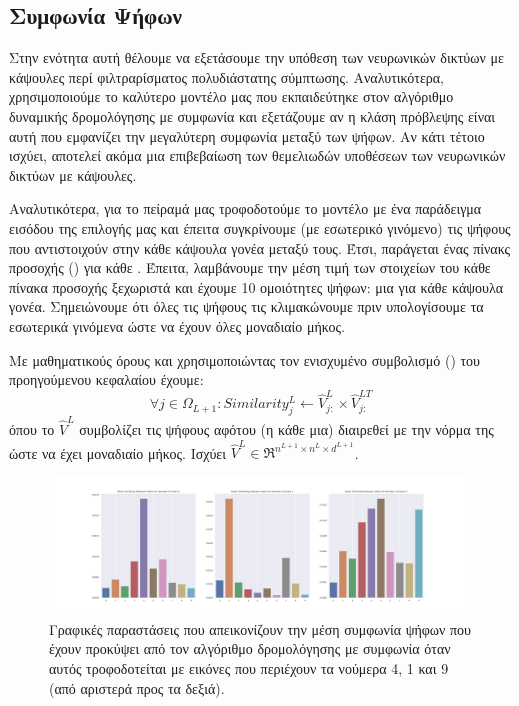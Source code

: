 \subsection{Συμφωνία Ψήφων}
Στην ενότητα αυτή θέλουμε να εξετάσουμε την υπόθεση των νευρωνικών δικτύων με κάψουλες περί φιλτραρίσματος πολυδιάστατης σύμπτωσης. Αναλυτικότερα, χρησιμοποιούμε το καλύτερο μοντέλο μας που εκπαιδεύτηκε στον αλγόριθμο δυναμικής δρομολόγησης με συμφωνία και εξετάζουμε αν η κλάση πρόβλεψης είναι αυτή που εμφανίζει την μεγαλύτερη συμφωνία μεταξύ των ψήφων. Αν κάτι τέτοιο ισχύει, αποτελεί ακόμα μια επιβεβαίωση των θεμελιωδών υποθέσεων των νευρωνικών δικτύων με κάψουλες.\par

Αναλυτικότερα, για το πείραμά μας τροφοδοτούμε το μοντέλο με ένα παράδειγμα εισόδου της επιλογής μας και έπειτα συγκρίνουμε (με εσωτερικό γινόμενο) τις ψήφους που αντιστοιχούν στην κάθε κάψουλα γονέα μεταξύ τους. Έτσι, παράγεται ένας πίνακς προσοχής () για κάθε . Έπειτα, λαμβάνουμε την μέση τιμή των στοιχείων του κάθε πίνακα προσοχής ξεχωριστά και έχουμε 10 ομοιότητες ψήφων: μια για κάθε κάψουλα γονέα. Σημειώνουμε ότι όλες τις ψήφους τις κλιμακώνουμε πριν υπολογίσουμε τα εσωτερικά γινόμενα ώστε να έχουν όλες μοναδιαίο μήκος.\par

Με μαθηματικούς όρους και χρησιμοποιώντας τον ενισχυμένο συμβολισμό () του προηγούμενου κεφαλαίου έχουμε:
\begin{equation}
    \forall j \in \Omega_{L+1}: Similarity^L_{j} \gets \hat{V}^L_{j:} \times \hat{V}^{LΤ}_{j:}
\end{equation}
όπου το $\hat{V}^L$ συμβολίζει τις ψήφους αφότου (η κάθε μια) διαιρεθεί με την νόρμα της ώστε να έχει μοναδιαίο μήκος. Ισχύει $\hat{V}^L \in \Re^{ n^{L+1} \times n^L \times d^{L+1}}$.
\begin{figure}[h]
    \centering
    \includegraphics[trim={8cm 0 7.5cm 0},clip, width=0.98\textwidth]{images/chapter experiments/method 1/image 10/barplot_combined.png}
    \caption{Γραφικές παραστάσεις που απεικονίζουν την μέση συμφωνία ψήφων που έχουν προκύψει από τον αλγόριθμο δρομολόγησης με συμφωνία όταν αυτός τροφοδοτείται με εικόνες που περιέχουν τα νούμερα 4, 1 και 9 (από αριστερά προς τα δεξιά).}
    \label{fig:exp_method_1_special_vote_sim_1}
  \end{figure}

